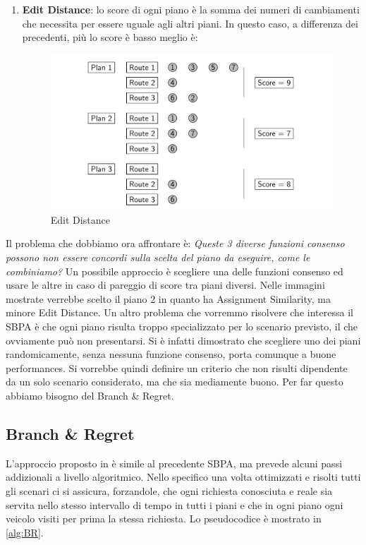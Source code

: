 \documentclass[
    article,            %
    12pt,                %
    oneside,            %
    a4paper,            %
    english,            %
    italian,                %
    sumario=tradicional,
]{abntex2}
\begin{document}
\begin{enumerate}
    \item \textbf{Edit Distance}: lo score di ogni piano è la somma dei numeri di cambiamenti che necessita per essere uguale agli altri piani. In questo caso, a differenza dei precedenti, più lo score è basso meglio è:
    \begin{figure}[h!]
        \centering
        \includegraphics[scale=0.35]{Images/EditDistance.png}
        \caption{Edit Distance}
        \label{fig:EditDistance}
    \end{figure}
    
\end{enumerate}

Il problema che dobbiamo ora affrontare è: \textit{Queste 3 diverse funzioni consenso possono non essere concordi sulla scelta del piano da eseguire, come le combiniamo?}\newline
Un possibile approccio è scegliere una delle funzioni consenso ed usare le altre in caso di pareggio di score tra piani diversi. Nelle immagini mostrate verrebbe scelto il piano 2 in quanto ha Assignment Similarity, ma minore Edit Distance.\newline
Un altro problema che vorremmo risolvere che interessa il SBPA è che ogni piano risulta troppo specializzato per lo scenario previsto, il che ovviamente può non presentarsi. Si è infatti dimostrato che scegliere uno dei piani randomicamente, senza nessuna funzione consenso, porta comunque a buone performances. Si vorrebbe quindi definire un criterio che non risulti dipendente da un solo scenario considerato, ma che sia mediamente buono. Per far questo abbiamo bisogno del Branch \& Regret.

\hypertarget{branch-and-regret}{%
\subsection{Branch \& Regret}\label{branch-and-regret}}
L'approccio proposto in \textcite{BRH} è simile al precedente SBPA, ma prevede alcuni passi addizionali a livello algoritmico. Nello specifico una volta ottimizzati e risolti tutti gli scenari ci si assicura, forzandole, che ogni richiesta conosciuta e reale sia servita nello stesso intervallo di tempo in tutti i piani e che in ogni piano ogni veicolo visiti per prima la stessa richiesta. Lo pseudocodice è mostrato in \ref{alg:BR}.
\end{document}
